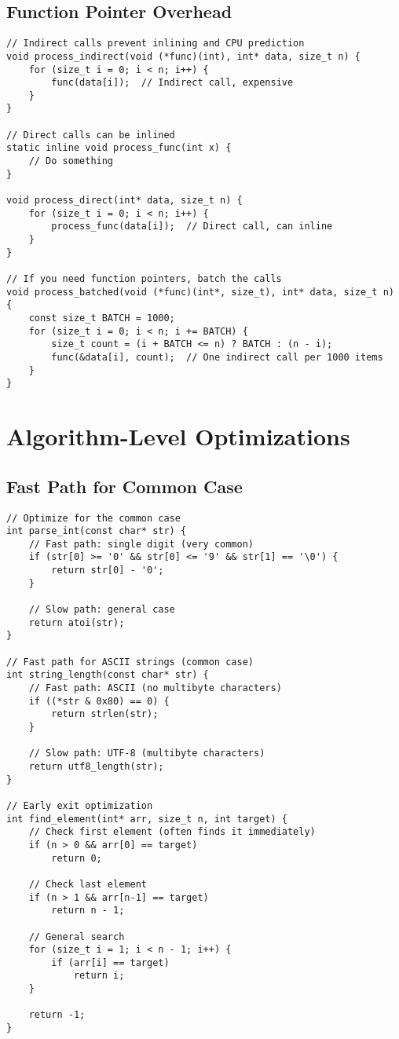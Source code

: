\subsection{Function Pointer Overhead}

\begin{lstlisting}
// Indirect calls prevent inlining and CPU prediction
void process_indirect(void (*func)(int), int* data, size_t n) {
    for (size_t i = 0; i < n; i++) {
        func(data[i]);  // Indirect call, expensive
    }
}

// Direct calls can be inlined
static inline void process_func(int x) {
    // Do something
}

void process_direct(int* data, size_t n) {
    for (size_t i = 0; i < n; i++) {
        process_func(data[i]);  // Direct call, can inline
    }
}

// If you need function pointers, batch the calls
void process_batched(void (*func)(int*, size_t), int* data, size_t n) {
    const size_t BATCH = 1000;
    for (size_t i = 0; i < n; i += BATCH) {
        size_t count = (i + BATCH <= n) ? BATCH : (n - i);
        func(&data[i], count);  // One indirect call per 1000 items
    }
}
\end{lstlisting}

\section{Algorithm-Level Optimizations}

\subsection{Fast Path for Common Case}

\begin{lstlisting}
// Optimize for the common case
int parse_int(const char* str) {
    // Fast path: single digit (very common)
    if (str[0] >= '0' && str[0] <= '9' && str[1] == '\0') {
        return str[0] - '0';
    }

    // Slow path: general case
    return atoi(str);
}

// Fast path for ASCII strings (common case)
int string_length(const char* str) {
    // Fast path: ASCII (no multibyte characters)
    if ((*str & 0x80) == 0) {
        return strlen(str);
    }

    // Slow path: UTF-8 (multibyte characters)
    return utf8_length(str);
}

// Early exit optimization
int find_element(int* arr, size_t n, int target) {
    // Check first element (often finds it immediately)
    if (n > 0 && arr[0] == target)
        return 0;

    // Check last element
    if (n > 1 && arr[n-1] == target)
        return n - 1;

    // General search
    for (size_t i = 1; i < n - 1; i++) {
        if (arr[i] == target)
            return i;
    }

    return -1;
}
\end{lstlisting}

